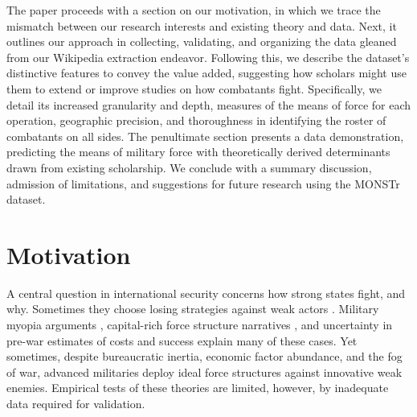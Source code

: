 \documentclass[fleqn,12pt]{article}
\begin{document}
The paper proceeds with a section on our motivation, in which we trace the mismatch between our research interests and existing theory and data. Next, it outlines our approach in collecting, validating, and organizing the data gleaned from our Wikipedia extraction endeavor. Following this, we describe the dataset's distinctive features to convey the value added, suggesting how scholars might use them to extend or improve studies on how combatants fight. Specifically, we detail its increased granularity and depth, measures of the means of force for each operation, geographic precision, and thoroughness in identifying the roster of combatants on all sides. The penultimate section presents a data demonstration, predicting the means of military force with theoretically derived determinants drawn from existing scholarship. We conclude with a summary discussion, admission of limitations, and suggestions for future research using the MONSTr dataset.

\section*{Motivation}
A central question in international security concerns how strong states fight, and why. Sometimes they choose losing strategies against weak actors \citep{arreguin-toft_howweakwin_2001}. Military myopia arguments \citep{gentry_doomedfailamerica_2002, lyall_ragemachinesexplaining_2009}, capital-rich force structure narratives \citep{gartzke_democracypreparationwar_2001, caverley_mythmilitarymyopia_2009}, and uncertainty in pre-war estimates of costs and success \citep{sullivan_militaryinterventionpowerful_2009} explain many of these cases. Yet sometimes, despite bureaucratic inertia, economic factor abundance, and the fog of war, advanced militaries deploy ideal force structures against innovative weak enemies. Empirical tests of these theories are limited, however, by inadequate data required for validation. 
\end{document}
